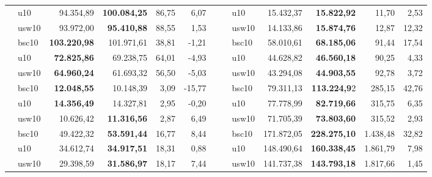 \begin{table}[ht]
\begin{tabular}{clrrrr|cclrrrr}
& u10 & 94.354,89 & \textbf{100.084,25} & 86,75 & 6,07 && & u10 & 15.432,37 & \textbf{15.822,92} & 11,70 & 2,53\\
& usw10 & 93.972,00 & \textbf{95.410,88} & 88,55 & 1,53 & && usw10 & 14.133,86 & \textbf{15.874,76} & 12,87 & 12,32\\
\hline
\parbox[t]{2mm}{} & bsc10 & \textbf{103.220,98} & 101.971,61 & 38,81 & -1,21 & \parbox[t]{2mm}{} & \parbox[t]{2mm}{}& bsc10 & 58.010,61 & \textbf{68.185,06} & 91,44 & 17,54\\
& u10 & \textbf{72.825,86} & 69.238,75 & 64,01 & -4,93 & & & u10 & 44.628,82 & \textbf{46.560,18} & 90,25 & 4,33\\
& usw10 & \textbf{64.960,24} & 61.693,32 & 56,50 & -5,03 & & & usw10 & 43.294,08 & \textbf{44.903,55} & 92,78 & 3,72\\
\hline
\parbox[t]{2mm}{} & bsc10 & \textbf{12.048,55} & 10.148,39 & 3,09 & -15,77 & \parbox[t]{2mm}{} & \parbox[t]{2mm}{} & bsc10 & 79.311,13 & \textbf{113.224,9}2 & 285,15 & 42,76\\
& u10 & \textbf{14.356,49} & 14.327,81 & 2,95 & -0,20 & & & u10 & 77.778,99 & \textbf{82.719,66} & 315,75 & 6,35\\
& usw10 & 10.626,42 & \textbf{11.316,56} & 2,87 & 6,49 & & & usw10 & 71.705,39 & \textbf{73.803,60} & 315,52 & 2,93\\
\hline
\parbox[t]{2mm}{} & bsc10 & 49.422,32 & \textbf{53.591,44} & 16,77 & 8,44 & \parbox[t]{2mm}{} & \parbox[t]{2mm}{} & bsc10 & 171.872,05 & \textbf{228.275,10} & 1.438,48 & 32,82\\
& u10 & 34.612,74 & \textbf{34.917,51} & 18,31 & 0,88 & & & u10 & 148.490,64 & \textbf{160.338,45} & 1.861,79 & 7,98\\
& usw10 & 29.398,59 & \textbf{31.586,97} & 18,17 & 7,44 & & & usw10 & 141.737,38 & \textbf{143.793,18} & 1.817,66 & 1,45\\\hline
\end{tabular}
\end{table}


